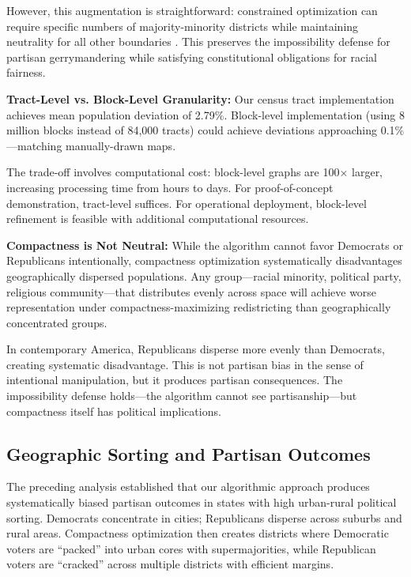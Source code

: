 However, this augmentation is straightforward: constrained optimization can require specific numbers of majority-minority districts while maintaining neutrality for all other boundaries \cite{duchin2018gerrymandering}. This preserves the impossibility defense for partisan gerrymandering while satisfying constitutional obligations for racial fairness.

\textbf{Tract-Level vs. Block-Level Granularity:} Our census tract implementation achieves mean population deviation of 2.79\%. Block-level implementation (using 8 million blocks instead of 84,000 tracts) could achieve deviations approaching 0.1\%—matching manually-drawn maps.

The trade-off involves computational cost: block-level graphs are 100× larger, increasing processing time from hours to days. For proof-of-concept demonstration, tract-level suffices. For operational deployment, block-level refinement is feasible with additional computational resources.

\textbf{Compactness is Not Neutral:} While the algorithm cannot favor Democrats or Republicans intentionally, compactness optimization systematically disadvantages geographically dispersed populations. Any group—racial minority, political party, religious community—that distributes evenly across space will achieve worse representation under compactness-maximizing redistricting than geographically concentrated groups.

In contemporary America, Republicans disperse more evenly than Democrats, creating systematic disadvantage. This is not partisan bias in the sense of intentional manipulation, but it produces partisan consequences. The impossibility defense holds—the algorithm cannot see partisanship—but compactness itself has political implications.

\subsection{Geographic Sorting and Partisan Outcomes}
\label{sec:geographic_sorting}

The preceding analysis established that our algorithmic approach produces systematically biased partisan outcomes in states with high urban-rural political sorting. Democrats concentrate in cities; Republicans disperse across suburbs and rural areas. Compactness optimization then creates districts where Democratic voters are ``packed'' into urban cores with supermajorities, while Republican voters are ``cracked'' across multiple districts with efficient margins.

